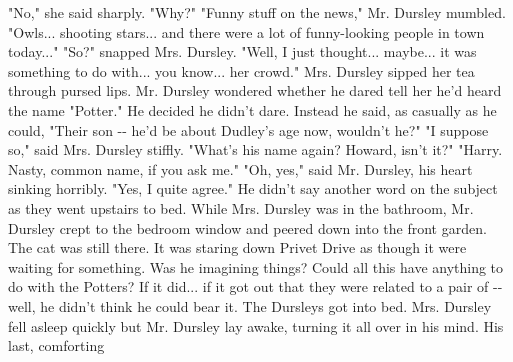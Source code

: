 \documentclass{article}%
\begin{document}
"No," she said sharply. "Why?"
\newline%
"Funny stuff on the news," Mr. Dursley mumbled. "Owls... shooting
\newline%
stars... and there were a lot of funny{-}looking people in town today..."
\newline%
"So?" snapped Mrs. Dursley.
\newline%
"Well, I just thought... maybe... it was something to do with... you
\newline%
know... her crowd."
\newline%
Mrs. Dursley sipped her tea through pursed lips. Mr. Dursley wondered
\newline%
whether he dared tell her he'd heard the name "Potter." He decided he
\newline%
didn't dare. Instead he said, as casually as he could, "Their son {-}{-}
\newline%
he'd be about Dudley's age now, wouldn't he?"
\newline%
"I suppose so," said Mrs. Dursley stiffly.
\newline%
"What's his name again? Howard, isn't it?"
\newline%
"Harry. Nasty, common name, if you ask me."
\newline%
"Oh, yes," said Mr. Dursley, his heart sinking horribly. "Yes, I quite
\newline%
agree."
\newline%
He didn't say another word on the subject as they went upstairs to bed.
\newline%
While Mrs. Dursley was in the bathroom, Mr. Dursley crept to the bedroom
\newline%
window and peered down into the front garden. The cat was still there.
\newline%
It was staring down Privet Drive as though it were waiting for
\newline%
something.
\newline%
Was he imagining things? Could all this have anything to do with the
\newline%
Potters? If it did... if it got out that they were related to a pair of
\newline%
{-}{-} well, he didn't think he could bear it.
\newline%
The Dursleys got into bed. Mrs. Dursley fell asleep quickly but Mr.
\newline%
Dursley lay awake, turning it all over in his mind. His last, comforting
\newline%
\end{document}
